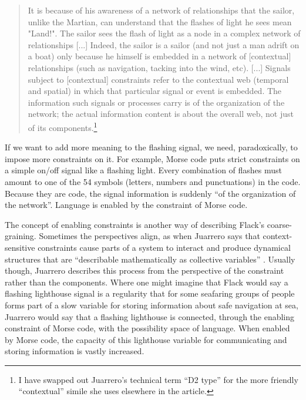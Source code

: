 \documentclass[letterpaper]{article}
\begin{document}
    \begin{quote}
        It is because of his awareness of a network of relationships that the sailor, unlike the Martian, can understand that the flashes of light he sees mean "Land!". The sailor sees the flash of light as a node in a complex network of relationships [...] Indeed, the sailor is a sailor (and not just a man adrift on a boat) only because he himself is embedded in a network of [contextual] relationships (such as navigation, tacking into the wind, etc). [...] Signals subject to [contextual] constraints refer to the contextual web (temporal and spatial) in which that particular signal or event is embedded. The information such signals or processes carry is of the organization of the network; the actual information content is about the overall web, not just of its components.\footnote{

            I have swapped out Juarrero's technical term “D2 type” for the more friendly “contextual” simile she uses elsewhere in the article.

        } \citep[p.237]{JuarreroCsltyAsCnstrnt1998}
    \end{quote}
    
    If we want to add more meaning to the flashing signal, we need, paradoxically, to impose more constraints on it. For example, Morse code puts strict constraints on a simple on/off signal like a flashing light. Every combination of flashes must amount to one of the 54 symbols (letters, numbers and punctuations) in the code. Because they are code, the signal information is suddenly “of the organization of the network”. Language is enabled by the constraint of Morse code.

    The concept of enabling constraints is another way of describing Flack's coarse-graining. Sometimes the perspectives align, as when Juarrero says that context-sensitive constraints cause parts of a system to interact and produce dynamical structures that are “describable mathematically as collective variables” \citep[p.193]{JuarreroThSlfOrgnstnOfIntntnlActn2004}. Usually though, Juarrero describes this process from the perspective of the constraint rather than the components. Where one might imagine that Flack would say a flashing lighthouse signal is a regularity that for some seafaring groups of people forms part of a slow variable for storing information about safe navigation at sea, Juarrero would say that a flashing lighthouse is connected, through the enabling constraint of Morse code, with the possibility space of language. When enabled by Morse code, the capacity of this lighthouse variable for communicating and storing information is vastly increased.
\end{document}
